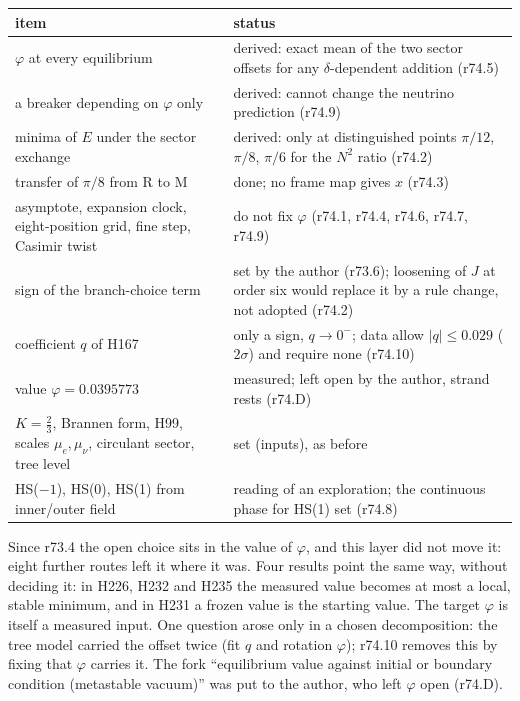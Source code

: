 \begin{center}
\small
\begin{tabular}{@{}>{\raggedright\arraybackslash}p{}>{\raggedright\arraybackslash}p{}@{}}
\toprule
item & status\\
\midrule
\(\varphi\) at every equilibrium & derived: exact mean of the two sector offsets for any \(\delta\)-dependent addition (r74.5)\\
a breaker depending on \(\varphi\) only & derived: cannot change the neutrino prediction (r74.9)\\
minima of \(E\) under the sector exchange & derived: only at distinguished points \(\pi/12\), \(\pi/8\), \(\pi/6\) for the \(N^2\) ratio (r74.2)\\
transfer of \(\pi/8\) from R to M & done; no frame map gives \(x\) (r74.3)\\
asymptote, expansion clock, eight-position grid, fine step, Casimir twist & do not fix \(\varphi\) (r74.1, r74.4, r74.6, r74.7, r74.9)\\
sign of the branch-choice term & set by the author (r73.6); loosening of \(J\) at order six would replace it by a rule change, not adopted (r74.2)\\
coefficient \(q\) of H167 & only a sign, \(q\to0^-\); data allow \(|q|\le0.029\) (\(2\sigma\)) and require none (r74.10)\\
value \(\varphi=0.0395773\) & measured; left open by the author, strand rests (r74.D)\\
\(K=\tfrac23\), Brannen form, H99, scales \(\mu_e,\mu_\nu\), circulant sector, tree level & set (inputs), as before\\
HS(\(-1\)), HS(0), HS(1) from inner/outer field & reading of an exploration; the continuous phase for HS(1) set (r74.8)\\
\bottomrule
\end{tabular}
\end{center}
Since r73.4 the open choice sits in the value of \(\varphi\), and this layer did not move it: eight further routes left it where it was.  Four
results point the same way, without deciding it: in H226, H232 and H235 the measured value becomes at most a local, stable minimum, and in H231
a frozen value is the starting value.  The target \(\varphi\) is itself a measured input.  One question arose only in a chosen decomposition:
the tree model carried the offset twice (fit \(q\) and rotation \(\varphi\)); r74.10 removes this by fixing that \(\varphi\) carries it.  The fork
``equilibrium value against initial or boundary condition (metastable vacuum)'' was put to the author, who left \(\varphi\) open (r74.D).

